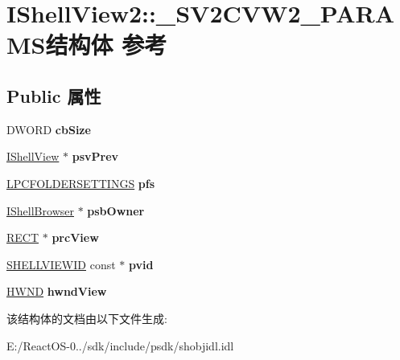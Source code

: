 \hypertarget{struct_i_shell_view2_1_1___s_v2_c_v_w2___p_a_r_a_m_s}{}\section{I\+Shell\+View2\+:\+:\+\_\+\+S\+V2\+C\+V\+W2\+\_\+\+P\+A\+R\+A\+M\+S结构体 参考}
\label{struct_i_shell_view2_1_1___s_v2_c_v_w2___p_a_r_a_m_s}
\subsection*{Public 属性}
\begin{DoxyCompactItemize}
\item 
\mbox{\label{struct_i_shell_view2_1_1___s_v2_c_v_w2___p_a_r_a_m_s_a46fdfead6ce686260bf69b2bd5209ae7}} 
D\+W\+O\+RD {\bfseries cb\+Size}
\item 
\mbox{\label{struct_i_shell_view2_1_1___s_v2_c_v_w2___p_a_r_a_m_s_ac276314b1cc49af1fbb6bf5d466917ae}} 
\hyperlink{interface_i_shell_view}{I\+Shell\+View} $\ast$ {\bfseries psv\+Prev}
\item 
\mbox{\label{struct_i_shell_view2_1_1___s_v2_c_v_w2___p_a_r_a_m_s_a26196490b96c8ca51949a99ab40ab299}} 
\hyperlink{struct_f_o_l_d_e_r_s_e_t_t_i_n_g_s}{L\+P\+C\+F\+O\+L\+D\+E\+R\+S\+E\+T\+T\+I\+N\+GS} {\bfseries pfs}
\item 
\mbox{\label{struct_i_shell_view2_1_1___s_v2_c_v_w2___p_a_r_a_m_s_ab6ce79964396245da59ab827fa5615f8}} 
\hyperlink{interface_i_shell_browser}{I\+Shell\+Browser} $\ast$ {\bfseries psb\+Owner}
\item 
\mbox{\label{struct_i_shell_view2_1_1___s_v2_c_v_w2___p_a_r_a_m_s_a5e444bdb14c7a9f115c005172ec15092}} 
\hyperlink{structtag_r_e_c_t}{R\+E\+CT} $\ast$ {\bfseries prc\+View}
\item 
\mbox{\label{struct_i_shell_view2_1_1___s_v2_c_v_w2___p_a_r_a_m_s_a490e36ef920277316020e4681aa5d325}} 
\hyperlink{interface_g_u_i_d}{S\+H\+E\+L\+L\+V\+I\+E\+W\+ID} const  $\ast$ {\bfseries pvid}
\item 
\mbox{\label{struct_i_shell_view2_1_1___s_v2_c_v_w2___p_a_r_a_m_s_a184142ec3fa92839d4018e36dad85da5}} 
\hyperlink{interfacevoid}{H\+W\+ND} {\bfseries hwnd\+View}
\end{DoxyCompactItemize}


该结构体的文档由以下文件生成\+:\begin{DoxyCompactItemize}
\item 
E\+:/\+React\+O\+S-\/0../sdk/include/psdk/shobjidl.\+idl\end{DoxyCompactItemize}
